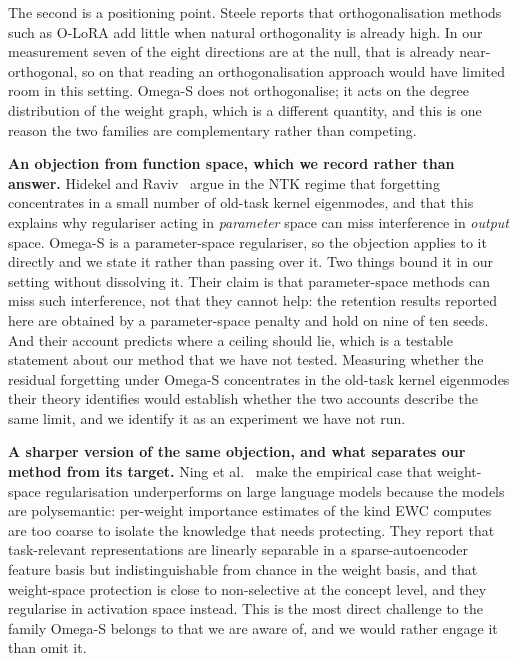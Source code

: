 \documentclass[11pt,a4paper]{article}
\begin{document}
The second is a positioning point. Steele reports that orthogonalisation
methods such as O-LoRA add little when natural orthogonality is already high.
In our measurement seven of the eight directions are at the null, that is
already near-orthogonal, so on that reading an orthogonalisation approach would
have limited room in this setting. Omega-S does not orthogonalise; it acts on
the degree distribution of the weight graph, which is a different quantity, and
this is one reason the two families are complementary rather than competing.

\textbf{An objection from function space, which we record rather than
answer.} Hidekel and Raviv~\cite{cflowrank2026} argue in the NTK regime that
forgetting concentrates in a small number of old-task kernel eigenmodes, and
that this explains why regulariser acting in \emph{parameter} space can miss
interference in \emph{output} space. Omega-S is a parameter-space regulariser,
so the objection applies to it directly and we state it rather than passing
over it. Two things bound it in our setting without dissolving it. Their claim
is that parameter-space methods can miss such interference, not that they
cannot help: the retention results reported here are obtained by a
parameter-space penalty and hold on nine of ten seeds. And their account
predicts where a ceiling should lie, which is a testable statement about our
method that we have not tested. Measuring whether the residual forgetting under
Omega-S concentrates in the old-task kernel eigenmodes their theory identifies
would establish whether the two accounts describe the same limit, and we
identify it as an experiment we have not run.

\textbf{A sharper version of the same objection, and what separates our
method from its target.} Ning et al.~\cite{ning2026sae} make the empirical
case that weight-space regularisation underperforms on large language models
because the models are polysemantic: per-weight importance estimates of the
kind EWC computes are too coarse to isolate the knowledge that needs
protecting. They report that task-relevant representations are linearly
separable in a sparse-autoencoder feature basis but indistinguishable from
chance in the weight basis, and that weight-space protection is close to
non-selective at the concept level, and they regularise in activation space
instead. This is the most direct challenge to the family Omega-S belongs to
that we are aware of, and we would rather engage it than omit it.
\end{document}

